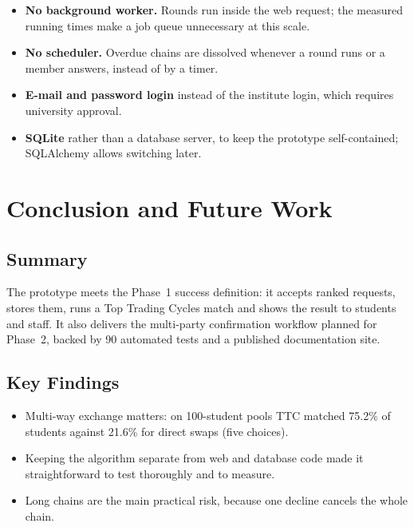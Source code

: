 \documentclass{tietreport}
\begin{document}
\begin{itemize}
  \item \textbf{No background worker.} Rounds run inside the web
    request; the measured running times make a job queue unnecessary at
    this scale.
  \item \textbf{No scheduler.} Overdue chains are dissolved whenever a
    round runs or a member answers, instead of by a timer.
  \item \textbf{E-mail and password login} instead of the institute
    login, which requires university approval.
  \item \textbf{SQLite} rather than a database server, to keep the
    prototype self-contained; SQLAlchemy allows switching later.
\end{itemize}

\chapter{Conclusion and Future Work}

\section{Summary}

The prototype meets the Phase~1 success definition: it accepts ranked
requests, stores them, runs a Top Trading Cycles match and shows the
result to students and staff. It also delivers the multi-party
confirmation workflow planned for Phase~2, backed by 90 automated tests
and a published documentation site.

\section{Key Findings}

\begin{itemize}
  \item Multi-way exchange matters: on 100-student pools TTC matched
    75.2\% of students against 21.6\% for direct swaps (five choices).
  \item Keeping the algorithm separate from web and database code made
    it straightforward to test thoroughly and to measure.
  \item Long chains are the main practical risk, because one decline
    cancels the whole chain.
\end{itemize}
\end{document}
